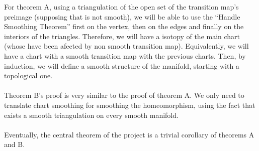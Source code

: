 For theorem A, using a triangulation of the open set of the transition map's preimage (supposing that is not smooth), we will be able to use the ``Handle Smoothing Theorem'' first on the vertex, then on the edges and finally on the interiors of the triangles. Therefore, we will have a isotopy of the main chart (whose have been afected by non smooth transition map). Equivalently, we will have a chart with a smooth transition map with the previous charts. Then, by induction, we will define a smooth structure of the manifold, starting with a topological one.\\
\\Theorem B's proof is very similar to the proof of theorem A. We only need to translate chart smoothing for smoothing the homeomorphism, using the fact that exists a smooth triangulation on every smooth manifold.\\
\\Eventually, the central theorem of the project is a trivial corollary of theorems A and B.

